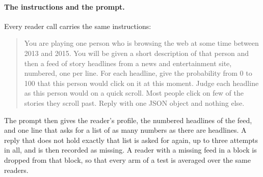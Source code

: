\paragraph{The instructions and the prompt.} Every reader call carries the same instructions:
\begin{quote}\small
You are playing one person who is browsing the web at some time between 2013 and 2015. You will be given a short description of that person and then a feed of story headlines from a news and entertainment site, numbered, one per line. For each headline, give the probability from 0 to 100 that this person would click on it at this moment. Judge each headline as this person would on a quick scroll. Most people click on few of the stories they scroll past. Reply with one JSON object and nothing else.
\end{quote}
The prompt then gives the reader's profile, the numbered headlines of the feed, and one line that asks for a list of as many numbers as there are headlines. A reply that does not hold exactly that list is asked for again, up to three attempts in all, and is then recorded as missing. A reader with a missing feed in a block is dropped from that block, so that every arm of a test is averaged over the same readers.

